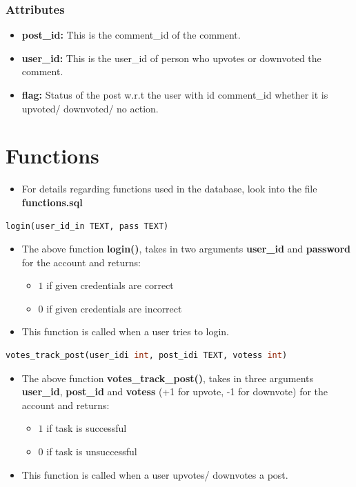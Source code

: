 \documentclass[12pt,a4paper]{article}
\begin{document}
\subsubsection{Attributes}
\begin{itemize}
	\item \textbf{post\_id:} This is the comment\_id of the comment.
	\item \textbf{user\_id:} This is the user\_id of person who upvotes or downvoted the comment.
	\item \textbf{flag:} Status of the post w.r.t the user with id comment\_id whether it is upvoted/ downvoted/ no action.
\end{itemize}



	\section{Functions}
	\begin{itemize}
	\item For details regarding functions used in the database, look into the file  \textbf{functions.sql}
\end{itemize}
	
	\begin{lstlisting}[language=SQL, style = mystyle]
		login(user_id_in TEXT, pass TEXT)
	\end{lstlisting}
\begin{itemize}
	\item The above function \textbf{login()}, takes in two arguments \textbf{user\_id} and \textbf{password} for the account and returns:
	\begin{itemize}
		\item $1$ if given credentials are correct
		\item $0$ if given credentials are incorrect
	\end{itemize}
\item This function is called when a user tries to login.
\end{itemize}
	\begin{lstlisting}[language=SQL, style = mystyle]
	votes_track_post(user_idi int, post_idi TEXT, votess int)
\end{lstlisting}
\begin{itemize}
	\item The above function \textbf{votes\_track\_post()}, takes in three arguments \textbf{user\_id}, \textbf{post\_id} and \textbf{votess} (+1 for upvote, -1 for downvote) for the account and returns:
	\begin{itemize}
		\item $1$ if task is successful
		\item $0$ if task is unsuccessful
	\end{itemize}
\item This function is called when a user upvotes/ downvotes a post.
\end{itemize}
	
\end{document}
